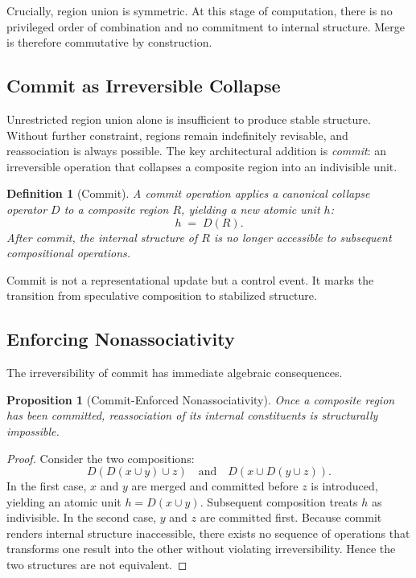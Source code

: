 \documentclass[11pt]{article}
\newtheorem{definition}{Definition}
\newtheorem{proposition}{Proposition}
\begin{document}
Crucially, region union is symmetric. At this stage of computation, there is no privileged order of combination and no commitment to internal structure. Merge is therefore commutative by construction.

\subsection{Commit as Irreversible Collapse}

Unrestricted region union alone is insufficient to produce stable structure. Without further constraint, regions remain indefinitely revisable, and reassociation is always possible. The key architectural addition is \emph{commit}: an irreversible operation that collapses a composite region into an indivisible unit.

\begin{definition}[Commit]
A commit operation applies a canonical collapse operator $D$ to a composite region $R$, yielding a new atomic unit $h$:
\[
h \;=\; D(R).
\]
After commit, the internal structure of $R$ is no longer accessible to subsequent compositional operations.
\end{definition}

Commit is not a representational update but a control event. It marks the transition from speculative composition to stabilized structure.

\subsection{Enforcing Nonassociativity}

The irreversibility of commit has immediate algebraic consequences.

\begin{proposition}[Commit-Enforced Nonassociativity]
Once a composite region has been committed, reassociation of its internal constituents is structurally impossible.
\end{proposition}

\begin{proof}
Consider the two compositions:
\[
D(D(x \cup y) \cup z) \quad\text{and}\quad D(x \cup D(y \cup z)).
\]
In the first case, $x$ and $y$ are merged and committed before $z$ is introduced, yielding an atomic unit $h = D(x \cup y)$. Subsequent composition treats $h$ as indivisible. In the second case, $y$ and $z$ are committed first. Because commit renders internal structure inaccessible, there exists no sequence of operations that transforms one result into the other without violating irreversibility. Hence the two structures are not equivalent.
\end{proof}
\end{document}
